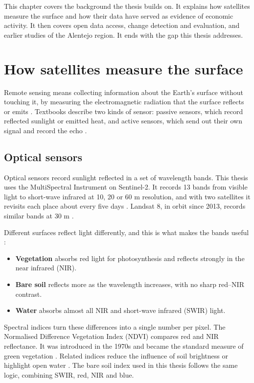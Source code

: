 

This chapter covers the background the thesis builds on. It explains how satellites measure the surface and how their data have served as evidence of economic activity. It then covers open data access, change detection and evaluation, and earlier studies of the Alentejo region. It ends with the gap this thesis addresses.

\section{How satellites measure the surface}

Remote sensing means collecting information about the Earth's surface without touching it, by measuring the electromagnetic radiation that the surface reflects or emits \cite{R201}. Textbooks describe two kinds of sensor: passive sensors, which record reflected sunlight or emitted heat, and active sensors, which send out their own signal and record the echo \cite{R212, R214}.

\subsection{Optical sensors}

Optical sensors record sunlight reflected in a set of wavelength bands. This thesis uses the MultiSpectral Instrument on Sentinel-2. It records 13 bands from visible light to short-wave infrared at 10, 20 or 60 m resolution, and with two satellites it revisits each place about every five days \cite{R262}. Landsat 8, in orbit since 2013, records similar bands at 30 m \cite{R238}.

Different surfaces reflect light differently, and this is what makes the bands useful \cite{R201}:

\begin{itemize}
  \item \textbf{Vegetation} absorbs red light for photosynthesis and reflects strongly in the near infrared (NIR).
  \item \textbf{Bare soil} reflects more as the wavelength increases, with no sharp red–NIR contrast.
  \item \textbf{Water} absorbs almost all NIR and short-wave infrared (SWIR) light.

\end{itemize}
Spectral indices turn these differences into a single number per pixel. The Normalised Difference Vegetation Index (NDVI) compares red and NIR reflectance. It was introduced in the 1970s \cite{R219} and became the standard measure of green vegetation \cite{R215}. Related indices reduce the influence of soil brightness \cite{R217} or highlight open water \cite{R216}. The bare soil index used in this thesis follows the same logic, combining SWIR, red, NIR and blue.

